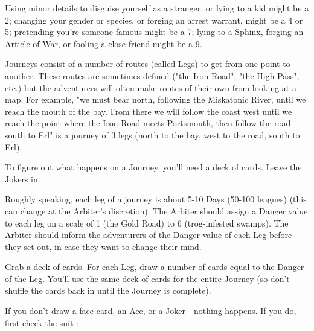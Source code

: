 {\begin{multicols}{2}
  Using minor details to disguise yourself as a stranger, or lying to a kid might be a 2; changing your gender or species, or forging an arrest warrant, might be a 4 or 5; pretending you're someone famous might be a 7; lying to a Sphinx, forging an Article of War, or fooling a close friend might be a 9.
  




Journeys consist of a number of routes (called Legs) to get from one point to another.  These routes are sometimes defined ("the Iron Road", "the High Pass", etc.) but the adventurers will often make routes of their own from looking at a map.  For example, "we must bear north, following the Miskatonic River, until we reach the mouth of the bay.  From there we will follow the coast west until we reach the point where the Iron Road meets Portsmouth, then follow the road south to Erl" is a journey of 3 legs (north to the bay, west to the road, south to Erl).

To figure out what happens on a Journey, you'll need a deck of cards.  Leave the Jokers in.

Roughly speaking, each leg of a journey is about 5-10 Days (50-100 leagues) (this can change at the Arbiter's discretion).  The Arbiter should assign a Danger value to each leg on a scale of 1 (the Gold Road) to 6 (trog-infested swamps).  The Arbiter should inform the adventurers of the Danger value of each Leg before they set out, in case they want to change their mind.

Grab a deck of cards.  For each Leg, draw a number of cards equal to the Danger of the Leg.  You'll use the same deck of cards for the entire Journey (so don't shuffle the cards back in until the Journey is complete).

If you don't draw a face card, an Ace, or a Joker - nothing happens.  If you do, first check the suit :



\end{multicols}}
